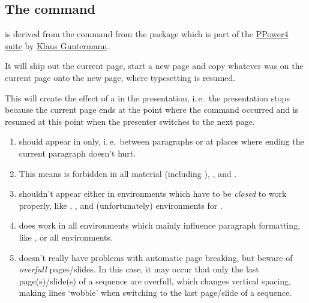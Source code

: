 \begin{slide}
\section{The  command}\label{Sec:pause}
 is derived from the  command from the package
\href{http://www-sp.iti.informatik.tu-darmstadt.de/software/ppower4/pp4sty.zip}{} which is part of the
\href{http://www-sp.iti.informatik.tu-darmstadt.de/software/ppower4/}{PPower4 suite} by
\href{mailto:guntermann@iti.informatik.tu-darmstadt.de}{Klaus Guntermann}.

  It will ship out the current page, start a new page and copy whatever was on the current page onto the new page, where
  typesetting is resumed.


  This will create the effect of a  in the presentation, i.\,e.\ the presentation stops because the
  current page ends at the point where the  command occurred and is resumed at this point when the
  presenter switches to the next page.

  \newslide

  \begin{enumerate}
  \item {} should appear in  only, i.\,e.\ between paragraphs or at places where
    ending the current paragraph doesn't hurt.

  \item This means  is forbidden in all  material (including ),
    , and .

  \item {} shouldn't appear either in environments which have to be \emph{closed} to work properly, like
    , , and (unfortunately) environments for .

  \item {} does work in all environments which mainly influence paragraph formatting, like ,
     or all  environments.

    \newslide

  \item {} doesn't really have problems with automatic page breaking, but beware of \emph{overfull}
    pages/slides. In this case, it may occur that only the last page(s)/slide(s) of a sequence are overfull, which
    changes vertical spacing, making lines `wobble' when switching to the last page/slide of a sequence.


\end{enumerate}
\end{slide}
